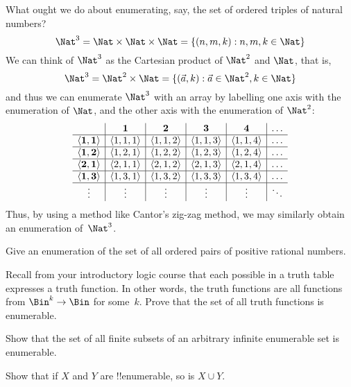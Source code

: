 \documentclass[../../../include/open-logic-section]{subfiles}
\begin{document}
\begin{explain}
What ought we do about enumerating, say, the set of ordered triples
of natural numbers?
\[
\Nat^3 = \Nat \times \Nat \times \Nat = \{ (n,m,k) : n,m,k \in \Nat \}
\]
We can think of $\Nat^3$ as the Cartesian product of
$\Nat^2$ and $\Nat$, that is,
\[
\Nat^3 = \Nat^2 \times \Nat = \Setabs{(\vec a,
k)}{\vec a \in \Nat^2, k \in \Nat }
\]
and thus we can enumerate $\Nat^3$ with an array by
labelling one axis with the enumeration of $\Nat$, and the
other axis with the enumeration of $\Nat^2$:
\[
\begin{array}{ c | c | c | c | c | c}
& \textbf 1 & \textbf 2 & \textbf 3 & \textbf 4 & \dots \\
\hline
\mathbf{\tuple{1,1}} & \tuple{1,1,1} & \tuple{1,1,2} & \tuple{1,1,3} & \tuple{1,1,4} & \dots \\
\hline
\mathbf{\tuple{1,2}} & \tuple{1,2,1} & \tuple{1,2,2} & \tuple{1,2,3} & \tuple{1,2,4} & \dots \\
\hline
\mathbf{\tuple{2,1}} & \tuple{2,1,1} & \tuple{2,1,2} & \tuple{2,1,3} & \tuple{2,1,4} & \dots \\
\hline
\mathbf{\tuple{1,3}} & \tuple{1,3,1} & \tuple{1,3,2} & \tuple{1,3,3} & \tuple{1,3,4} & \dots\\
\hline
\vdots & \vdots & \vdots & \vdots & \vdots & \ddots \\
\end{array}
\]
Thus, by using a method like Cantor's zig-zag method, we may
similarly obtain an enumeration of~$\Nat^3$.
\end{explain}

\begin{prob}
Give an enumeration of the set of all ordered pairs of positive
rational numbers.
\end{prob}

\begin{prob}
Recall from your introductory logic course that each possible in a
truth table expresses a truth function. In other words, the truth
functions are all functions from $\Bin^k \to \Bin$ for some~$k$. Prove
that the set of all truth functions is enumerable.
\end{prob}

\begin{prob}
Show that the set of all finite subsets of an arbitrary infinite
enumerable set is enumerable.
\end{prob}

\begin{prob}
Show that if $X$ and $Y$ are !!{enumerable}, so is $X \cup Y$.
\end{prob}
\end{document}
